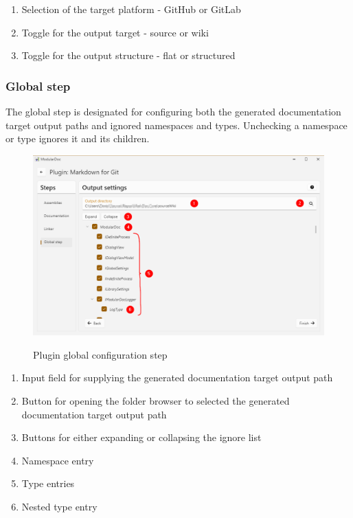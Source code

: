 \begin{enumerate}
    \item Selection of the target platform - GitHub or GitLab
    \item Toggle for the output target - source or wiki
    \item Toggle for the output structure - flat or structured
\end{enumerate}

\pagebreak
\subsubsection{Global step}

The global step is designated for configuring both the generated documentation target output paths and ignored namespaces and types.
Unchecking a namespace or type ignores it and its children.

\begin{figure}[H]
    \includegraphics[width=\linewidth]{img/modularDocGlobalSettings.png}
    \label{fig:modularGlobal}
    \caption{Plugin global configuration step}
\end{figure}

\begin{enumerate}
    \item Input field for supplying the generated documentation target output path
    \item Button for opening the folder browser to selected the generated documentation target output path
    \item Buttons for either expanding or collapsing the ignore list
    \item Namespace entry
    \item Type entries
    \item Nested type entry
\end{enumerate}

